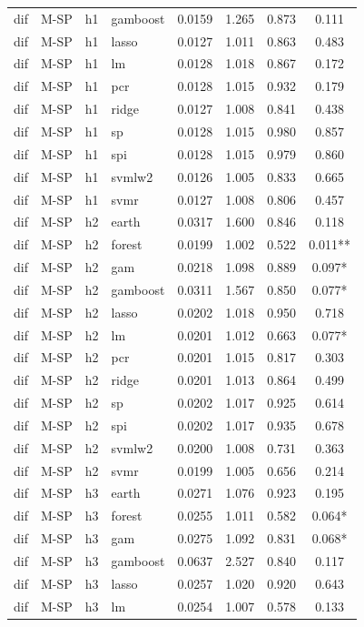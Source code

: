 \begin{ThreePartTable}
\begin{longtable}[t]{llclcccc}
dif & M-SP & h1 & gamboost & 0.0159 & 1.265 & 0.873 & 0.111\\
dif & M-SP & h1 & lasso & 0.0127 & 1.011 & 0.863 & 0.483\\
dif & M-SP & h1 & lm & 0.0128 & 1.018 & 0.867 & 0.172\\
dif & M-SP & h1 & pcr & 0.0128 & 1.015 & 0.932 & 0.179\\
dif & M-SP & h1 & ridge & 0.0127 & 1.008 & 0.841 & 0.438\\
dif & M-SP & h1 & sp & 0.0128 & 1.015 & 0.980 & 0.857\\
dif & M-SP & h1 & spi & 0.0128 & 1.015 & 0.979 & 0.860\\
dif & M-SP & h1 & svmlw2 & 0.0126 & 1.005 & 0.833 & 0.665\\
dif & M-SP & h1 & svmr & 0.0127 & 1.008 & 0.806 & 0.457\\
\addlinespace
dif & M-SP & h2 & earth & 0.0317 & 1.600 & 0.846 & 0.118\\
dif & M-SP & h2 & forest & 0.0199 & 1.002 & 0.522 & 0.011**\\
dif & M-SP & h2 & gam & 0.0218 & 1.098 & 0.889 & 0.097*\\
dif & M-SP & h2 & gamboost & 0.0311 & 1.567 & 0.850 & 0.077*\\
dif & M-SP & h2 & lasso & 0.0202 & 1.018 & 0.950 & 0.718\\
dif & M-SP & h2 & lm & 0.0201 & 1.012 & 0.663 & 0.077*\\
dif & M-SP & h2 & pcr & 0.0201 & 1.015 & 0.817 & 0.303\\
dif & M-SP & h2 & ridge & 0.0201 & 1.013 & 0.864 & 0.499\\
dif & M-SP & h2 & sp & 0.0202 & 1.017 & 0.925 & 0.614\\
dif & M-SP & h2 & spi & 0.0202 & 1.017 & 0.935 & 0.678\\
dif & M-SP & h2 & svmlw2 & 0.0200 & 1.008 & 0.731 & 0.363\\
dif & M-SP & h2 & svmr & 0.0199 & 1.005 & 0.656 & 0.214\\
\addlinespace
dif & M-SP & h3 & earth & 0.0271 & 1.076 & 0.923 & 0.195\\
dif & M-SP & h3 & forest & 0.0255 & 1.011 & 0.582 & 0.064*\\
dif & M-SP & h3 & gam & 0.0275 & 1.092 & 0.831 & 0.068*\\
dif & M-SP & h3 & gamboost & 0.0637 & 2.527 & 0.840 & 0.117\\
dif & M-SP & h3 & lasso & 0.0257 & 1.020 & 0.920 & 0.643\\
dif & M-SP & h3 & lm & 0.0254 & 1.007 & 0.578 & 0.133\\

\end{longtable}
\end{ThreePartTable}
